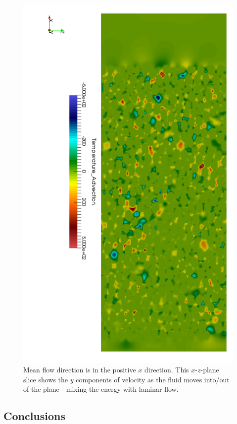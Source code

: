 \begin{figure}[t]
    \centering
    \includegraphics[width=\singleimagewidth]{figures/lbm/lbm-laminar-mixing}
    \caption{Mean flow direction is in the positive $x$ direction. This $x$-$z$-plane slice shows the $y$ components of velocity as the fluid moves into/out of the plane - mixing the energy with laminar flow.}\label{fig:lbm-laminar-mixing}
\end{figure}

\FloatBarrier
\subsection{Conclusions}







